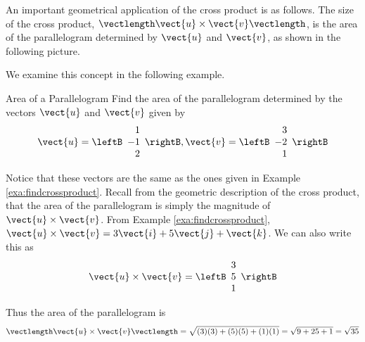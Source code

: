 An important geometrical application of the cross product is as follows. The size of the cross product, $\vectlength \vect{u}\times \vect{v}\vectlength $, is the area of the
parallelogram determined by $\vect{u}$ and $\vect{v}$, as shown in the following picture. 

\begin{center}
\end{center}

We examine this concept in the following example.

\begin{example}{Area of a Parallelogram}\label{exa:areaparallelogram}
Find the area of the
 parallelogram determined by the vectors $\vect{u}$
and $\vect{v}$ given by 
\begin{equation*}
\vect{u}
=
\leftB
\begin{array}{r}
1 \\
-1 \\
2
\end{array}
\rightB, 
\vect{v}
=
\leftB
\begin{array}{r}
3 \\
-2 \\
1
\end{array}
\rightB
\end{equation*}
\end{example}

\begin{solution}
Notice that these vectors are the same as the ones given in Example \ref{exa:findcrossproduct}.
Recall from the geometric description of the cross
product, that the area of the parallelogram is simply the magnitude of $\vect{u} \times \vect{v}$. 
From Example \ref{exa:findcrossproduct}, $\vect{u} \times \vect{v} = 3\vect{i}+5\vect{j}+\vect{k}$.
We can also write this as
\begin{equation*}
\vect{u} \times \vect{v}
=
\leftB
\begin{array}{r}
3 \\
5 \\
1
\end{array}
\rightB
\end{equation*}

Thus the area of the parallelogram is 
\begin{equation*}
\vectlength \vect{u} \times \vect{v} \vectlength = 
\sqrt{(3)(3) + (5)(5) + (1)(1)} = 
\sqrt{9+25+1}=\sqrt{35}
\end{equation*}
\end{solution}

